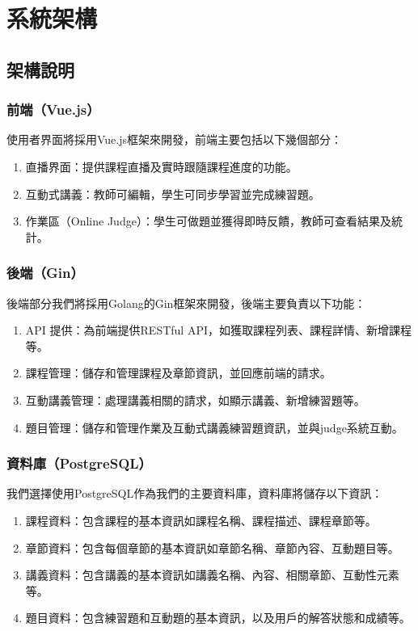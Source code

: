 \documentclass[12pt]{article}
\begin{document}
\newpage
\section{系統架構}

\subsection{架構說明}

\subsubsection{前端（Vue.js）}
使用者界面將採用Vue.js框架來開發，前端主要包括以下幾個部分：

\begin{enumerate}[label=\textbullet, noitemsep]
  \item 直播界面：提供課程直播及實時跟隨課程進度的功能。
  \item 互動式講義：教師可編輯，學生可同步學習並完成練習題。
  \item 作業區（Online Judge）：學生可做題並獲得即時反饋，教師可查看結果及統計。
\end{enumerate}

\subsubsection{後端（Gin）}
後端部分我們將採用Golang的Gin框架來開發，後端主要負責以下功能：

\begin{enumerate}[label=\textbullet, noitemsep]
  \item API 提供：為前端提供RESTful API，如獲取課程列表、課程詳情、新增課程等。
  \item 課程管理：儲存和管理課程及章節資訊，並回應前端的請求。
  \item 互動講義管理：處理講義相關的請求，如顯示講義、新增練習題等。
  \item 題目管理：儲存和管理作業及互動式講義練習題資訊，並與judge系統互動。
\end{enumerate}

\subsubsection{資料庫（PostgreSQL）}
我們選擇使用PostgreSQL作為我們的主要資料庫，資料庫將儲存以下資訊：

\begin{enumerate}[label=\textbullet, noitemsep]
  \item 課程資料：包含課程的基本資訊如課程名稱、課程描述、課程章節等。
  \item 章節資料：包含每個章節的基本資訊如章節名稱、章節內容、互動題目等。
  \item 講義資料：包含講義的基本資訊如講義名稱、內容、相關章節、互動性元素等。
  \item 題目資料：包含練習題和互動題的基本資訊，以及用戶的解答狀態和成績等。
\end{enumerate}
\end{document}
